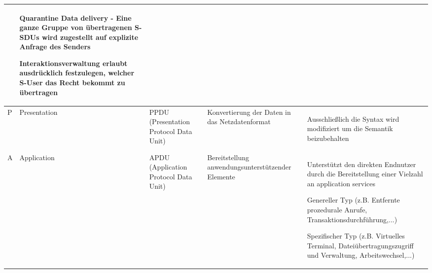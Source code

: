\documentclass[10pt,landscape]{article}
\begin{document}
\begin{tabular}{ l | l | l | p{6cm} | p{10cm} }
\begin{itemize*}
    \end{itemize*}                   & 
    \begin{itemize*}
        \item Quarantine Data delivery - Eine ganze Gruppe von übertragenen S-SDUs wird zugestellt auf explizite Anfrage des Senders
        \item Interaktionsverwaltung erlaubt ausdrücklich festzulegen, welcher S-User das Recht bekommt zu übertragen
    \end{itemize*}
    \\\hline
    P  & Presentation   & PPDU (Presentation Protocol Data Unit) & Konvertierung der Daten in das Netzdatenformat    & 
    \begin{itemize*}
        \item Ausschließlich die Syntax wird modifiziert um die Semantik beizubehalten
    \end{itemize*}
    \\\hline
    A  & Application    & APDU (Application Protocol Data Unit)  & Bereitstellung anwendungsunterstützender Elemente & 
    \begin{itemize*}
        \item Unterstützt den direkten Endnutzer durch die Bereitstellung einer Vielzahl an application services                                               
        \item Genereller Typ (z.B. Entfernte prozedurale Anrufe, Transaktionsdurchführung,...)
        \item Spezifischer Typ (z.B. Virtuelles Terminal, Dateiübertragungszugriff und Verwaltung, Arbeitswechsel,...)
    \end{itemize*}
    \\
\end{tabular}
\end{document}

